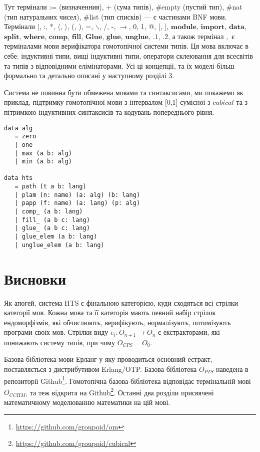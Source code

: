 Тут термінали := (визначенния), + (сума типів), \#empty (пустий тип), \#nat (тип натуральних чисел),
\#list (тип списків) --- є частинами BNF мови. Термінали
$\rvert$, :, *, $\langle$, $\rangle$, (, ), =, $\backslash$, /, -, $\rightarrow$, 0, 1, @, [, ],
$\mathbf{module}$, $\mathbf{import}$,
$\mathbf{data}$, $\mathbf{split}$, $\mathbf{where}$, $\mathbf{comp}$, $\mathbf{fill}$,
$\mathbf{Glue}$, $\mathbf{glue}$, $\mathbf{unglue}$,
$\mathbf{.1}$, $\mathbf{.2}$,
а також термінал $,$ є терміналами мови верифікатора гомотопічної системи типів.
Ця мова включає в себе: індуктивні типи, вищі індуктивні типи, оператори склеювання
для всесвітів та типів з відповідними елімінаторами. Усі ці концепції, та їх
моделі більш формально та детально описані у наступному розділі 3.

Система не повинна бути обмежена мовами та синтаксисами, ми покажемо як приклад,
підтримку гомотопічної мови з інтервалом [0,1] сумісної з $cubical$ та з пітримкою індуктивних
синтаксисів та кодувань попереднього рівня.

\begin{lstlisting}[mathescape=true]
data alg
   = zero
   | one
   | max (a b: alg)
   | min (a b: alg)

data hts
   = path (t a b: lang)
   | plam (n: name) (a: alg) (b: lang)
   | papp (f: name) (a: lang) (p: alg)
   | comp_ (a b: lang)
   | fill_ (a b c: lang)
   | glue_ (a b c: lang)
   | glue_elem (a b: lang)
   | unglue_elem (a b: lang)
\end{lstlisting}

\section{Висновки}
Як апогей, система HTS є фінальною категорією,
куди сходяться всі стрілки категорії мов. Кожна мова та її категорія
мають певний набір стрілок ендоморфізмів, які обчислюють, верифікують,
нормалізують, оптимізують програми своїх мов.
Стрілки виду $e_i: O_{n+1} \rightarrow O_n$ є екстракторами, які понижають систему типів,
при чому $O_{CPS} = O_0$.

Базова бібліотека мови Ерланг у яку проводиться основний
естракт, поставляється з дистрибутивом Erlang/OTP. Базова бібліотека
$O_{PTS}$ наведена в репозиторії Github\footnote{\url{https://github.com/groupoid/om}}.
Гомотопічна базова бібліотека відповідає термінальній мові $O_{CCHM}$, та теж відкрита
на Github\footnote{\url{https://github.com/groupoid/cubical}}.
Останні два розділи присвячені математичному моделюванню математики на цій мові.

